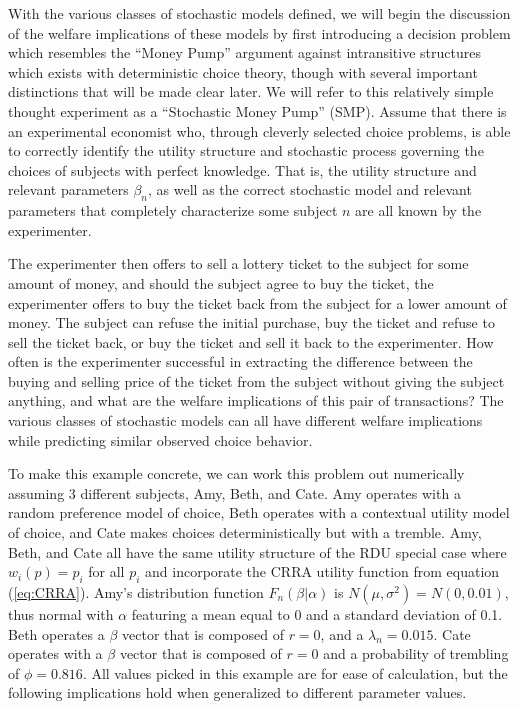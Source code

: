 With the various classes of stochastic models defined, we will begin the discussion of the welfare implications of these models by first introducing a decision problem which resembles the \enquote{Money Pump} argument against intransitive structures which exists with deterministic choice theory, though with several important distinctions that will be made clear later.
We will refer to this relatively simple thought experiment as a \enquote{Stochastic Money Pump} (SMP).
Assume that there is an experimental economist who, through cleverly selected choice problems, is able to correctly identify the utility structure and stochastic process governing the choices of subjects with perfect knowledge.
That is, the utility structure and relevant parameters $\beta_n$, as well as the correct stochastic model and relevant parameters that completely characterize some subject $n$ are all known by the experimenter.

The experimenter then offers to sell a lottery ticket to the subject for some amount of money, and should the subject agree to buy the ticket, the experimenter offers to buy the ticket back from the subject for a lower amount of money.
The subject can refuse the initial purchase, buy the ticket and refuse to sell the ticket back, or buy the ticket and sell it back to the experimenter.
How often is the experimenter successful in extracting the difference between the buying and selling price of the ticket from the subject without giving the subject anything, and what are the welfare implications of this pair of transactions?
The various classes of stochastic models can all have different welfare implications while predicting similar observed choice behavior.

To make this example concrete, we can work this problem out numerically assuming 3 different subjects, Amy, Beth, and Cate.
Amy operates with a random preference model of choice, Beth operates with a contextual utility model of choice, and Cate makes choices deterministically but with a tremble.
Amy, Beth, and Cate all have the same utility structure of the RDU special case where $w_i(p)=p_i$ for all $p_i$ and incorporate the CRRA utility function from equation (\ref{eq:CRRA}).
Amy's distribution function $F_n(\beta|\alpha)$ is $N(\mu,\sigma^2) = N(0,0.01)$, thus normal with $\alpha$ featuring a mean equal to 0 and a standard deviation of 0.1.
Beth operates a $\beta$ vector that is composed of $r=0$, and a $\lambda_n = 0.015$.
Cate operates with a $\beta$ vector that is composed of $r=0$ and a probability of trembling of $\phi = 0.816$.
All values picked in this example are for ease of calculation, but the following implications hold when generalized to different parameter values.

